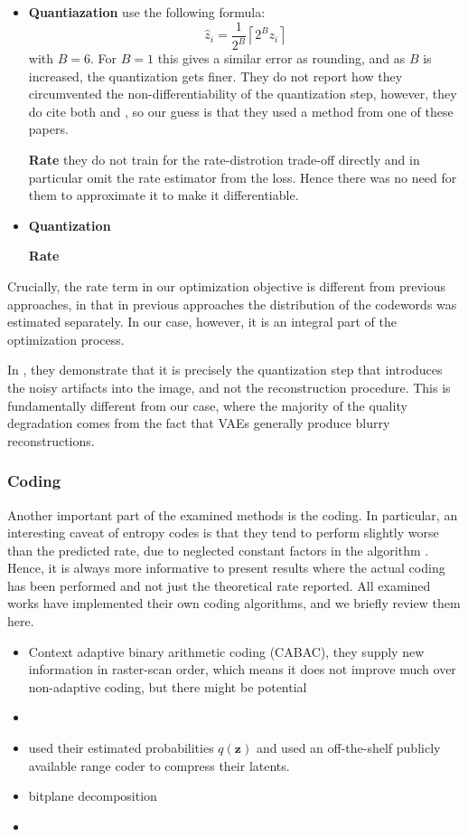 \documentclass{article}
\renewcommand{\vec}[1]{\mathbf{#1}}
\begin{document}
\begin{itemize}
\item
  \textbf{Quantiazation }
  \cite{rippel2017real} use the following formula:
  \[
    \hat{z}_i = \frac{1}{2^B}\left\lceil 2^Bz_i \right\rceil
  \]
  with $B = 6$. For $B = 1$ this gives a similar error as rounding, and as $B$
  is increased, the quantization gets finer. They do not report how they
  circumvented the non-differentiability of the quantization step, however, they
  do cite both \cite{balle2016end} and \cite{theis2017lossy}, so our guess is
  that they used a method from one of these papers.

  \textbf{Rate } they do not train for the rate-distrotion trade-off directly
  and in particular omit the rate estimator from the loss. Hence there was no
  need for them to approximate it to make it differentiable.
\item
  \textbf{Quantization }
  
  \cite{balle2018variational}
  \textbf{Rate }
\end{itemize}

Crucially, the rate term in our optimization objective is different from
previous approaches, in that in previous approaches the distribution of the
codewords was estimated separately. In our case, however, it is an integral part
of the optimization process.

In \cite{theis2017lossy}, they demonstrate that it is precisely the quantization
step that introduces the noisy artifacts into the image, and not the
reconstruction procedure. This is fundamentally different from our case, where
the majority of the quality degradation comes from the fact that VAEs generally
produce blurry reconstructions.

\subsubsection{Coding}
\par
Another important part of the examined methods is the coding. In particular, an
interesting caveat of entropy codes is that they tend to perform slightly worse
than the predicted rate, due to neglected constant factors in the algorithm
\cite{rissanen1981universal}. Hence, it is always more informative to present
results where the actual coding has been performed and not just the theoretical
rate reported. All examined works have implemented their own coding algorithms,
and we briefly review them here.
\begin{itemize}
\item \cite{balle2016end} Context adaptive binary arithmetic coding (CABAC),
  they supply new information in raster-scan order, which means it does not
  improve much over non-adaptive coding, but there might be potential
\item \cite{toderici2017full}
\item \cite{theis2017lossy} used their estimated probabilities $q(\vec{z})$ and
  used an off-the-shelf publicly available range coder to compress their latents.
\item \cite{rippel2017real} bitplane decomposition 
\item \cite{balle2018variational}
\end{itemize}
\end{document}

